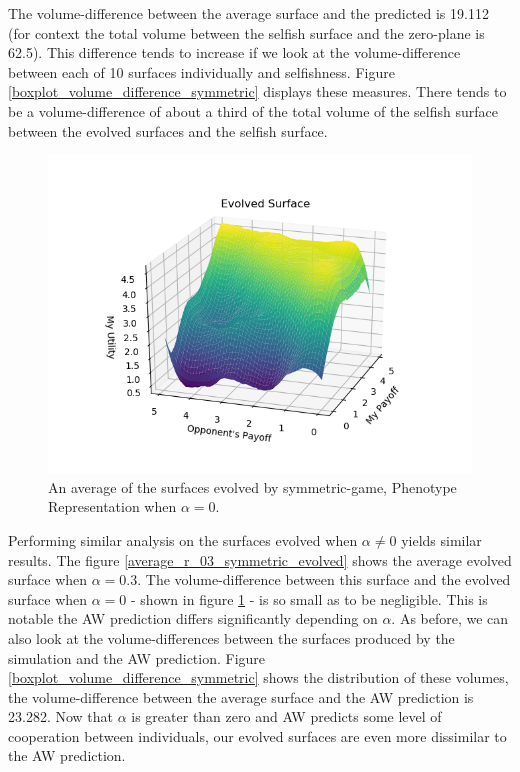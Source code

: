 \documentclass[11pt]{book}
\newcommand*{\np}{\par\noindent\newline}
\begin{document}
\np The volume-difference between the average surface and the predicted is 19.112 (for context the total volume between the selfish surface and the zero-plane is 62.5).
This difference tends to increase if we look at the volume-difference between each of 10 surfaces individually and selfishness.
Figure \ref{boxplot_volume_difference_symmetric} displays these measures.
There tends to be a volume-difference of about a third of the total volume of the selfish surface between the evolved surfaces and the selfish surface.

\begin{figure}
	\centering
	\includegraphics[scale=0.7]{resources/average_r_0_symmetric_evolved.png}
	\caption{An average of the surfaces evolved by symmetric-game, Phenotype Representation when $\alpha = 0$.}
	\label{average_r_0_symmetric_evolved}
\end{figure}

\np Performing similar analysis on the surfaces evolved when $\alpha \neq 0$ yields similar results.
The figure \ref{average_r_03_symmetric_evolved} shows the average evolved surface when $\alpha = 0.3$.
The volume-difference between this surface and the evolved surface when $\alpha = 0$ - shown in figure \ref{average_r_0_symmetric_evolved} - is so small as to be negligible.
This is notable the AW prediction differs significantly depending on $\alpha$.
As before, we can also look at the volume-differences between the surfaces produced by the simulation and the AW prediction.
Figure \ref{boxplot_volume_difference_symmetric} shows the distribution of these volumes, the volume-difference between the average surface and the AW prediction is 23.282.
Now that $\alpha$ is greater than zero and AW predicts some level of cooperation between individuals, our evolved surfaces are even more dissimilar to the AW prediction.
\end{document}
